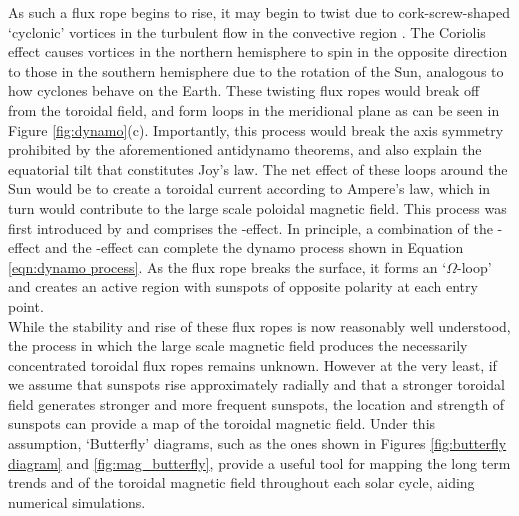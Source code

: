 \documentclass[11pt,a4paper,onecolumn]{report}
\begin{document}
As such a flux rope begins to rise, it may begin to twist due to
cork-screw-shaped `cyclonic' vortices in the turbulent flow in the convective
region \citep{parker_formation_1955}. The Coriolis effect causes vortices in the
northern hemisphere to spin in the opposite direction to those in the southern
hemisphere due to the rotation of the Sun, analogous to how cyclones behave on
the Earth. These twisting flux ropes would break off from the toroidal field,
and form loops in the meridional plane as can be seen in Figure
\ref{fig:dynamo}(c). Importantly, this process would break the axis symmetry
prohibited by the aforementioned antidynamo theorems, and also explain the
equatorial tilt that constitutes Joy's law. The net effect of these loops around
the Sun would be to create a toroidal current according to Ampere's law, which
in turn would contribute to the large scale poloidal magnetic field. This
process was first introduced by \citet{parker_hydromagnetic_1955} and comprises
the \textalpha-effect. In principle, a combination of the \textalpha-effect and
the \textomega-effect can complete the dynamo process shown in Equation
\ref{eqn:dynamo process}. As the flux rope breaks the surface, it forms an
`\(\Omega\)-loop' and creates an active region with sunspots of opposite
polarity at each entry point. \\

While the stability and rise of these flux ropes is now reasonably well
understood, the process in which the large scale magnetic field produces the
necessarily concentrated toroidal flux ropes remains unknown. However at the
very least, if we assume that sunspots rise approximately radially and that
a stronger toroidal field generates stronger and more frequent sunspots, the
location and strength of sunspots can provide a map of the toroidal magnetic
field. Under this assumption, `Butterfly' diagrams, such as the ones shown in
Figures \ref{fig:butterfly diagram} and \ref{fig:mag_butterfly}, provide a
useful tool for mapping the long term trends and of the toroidal magnetic field
throughout each solar cycle, aiding numerical simulations. \\
\end{document}
